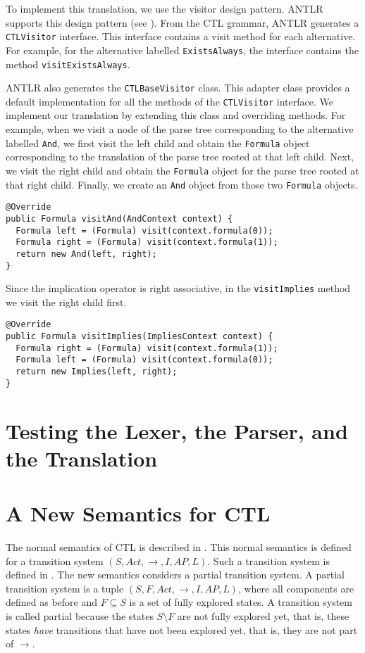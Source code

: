 \documentclass[12pt]{article}
\theoremstyle{definition}
\begin{document}
To implement this translation, we use the visitor design pattern.  ANTLR supports this design pattern (see \cite[Section~7.3]{P13}).  From the CTL grammar, ANTLR generates a \lstinline{CTLVisitor} interface.  This interface contains a visit method for each alternative.  For example, for the alternative labelled \lstinline{ExistsAlways}, the interface contains the method \lstinline{visitExistsAlways}.

ANTLR also generates the \lstinline{CTLBaseVisitor} class.  This adapter class provides a default implementation for all the methods of the \lstinline{CTLVisitor} interface.  We implement our translation by extending this class and overriding methods.  For example, when we visit a node of the parse tree corresponding to the alternative labelled \lstinline{And}, we first visit the left child and obtain the \lstinline{Formula} object corresponding to the translation of the parse tree rooted at that left child.  Next, we visit the right child and obtain the \lstinline{Formula} object for the parse tree rooted at that right child.  Finally, we create an \lstinline{And} object from those two \lstinline{Formula} objects.

\begin{lstlisting}
@Override
public Formula visitAnd(AndContext context) {
  Formula left = (Formula) visit(context.formula(0));
  Formula right = (Formula) visit(context.formula(1));
  return new And(left, right);
}
\end{lstlisting}

Since the implication operator is right associative, in the \lstinline{visitImplies} method we visit the right child first.
\begin{lstlisting}
@Override
public Formula visitImplies(ImpliesContext context) {
  Formula right = (Formula) visit(context.formula(1));
  Formula left = (Formula) visit(context.formula(0));
  return new Implies(left, right);
}
\end{lstlisting}

\section{Testing the Lexer, the Parser, and the Translation}




\section{A New Semantics for CTL}

The normal semantics of CTL is described in \cite[Section~6.2.2]{BK08}.  This normal semantics is defined for a transition system $(S, Act, \rightarrow, I, AP, L)$.  Such a transition system is defined in \cite[Definition~2.1]{BK08}.  The new semantics considers a partial transition system.  A partial transition system is a tuple $(S, F, Act, \rightarrow, I, AP, L)$, where all components are defined as before and $F \subseteq S$ is a set of fully explored states.  A transition system is called partial because the states $S \setminus F$ are not fully explored yet, that is, these states \emph{have} transitions that have not been explored yet, that is, they are not part of $\rightarrow$.
\end{document}
